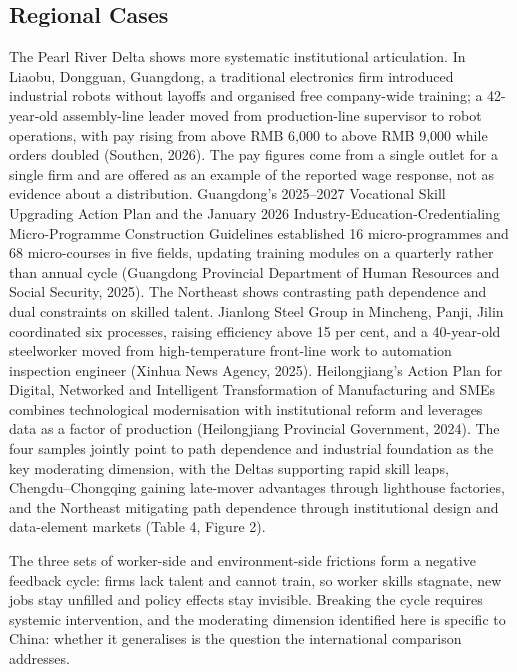 \documentclass[12pt]{article}
\begin{document}
\subsection{Regional Cases}

The Pearl River Delta shows more systematic institutional articulation. In Liaobu, Dongguan, Guangdong, a traditional electronics firm introduced industrial robots without layoffs and organised free company-wide training; a 42-year-old assembly-line leader moved from production-line supervisor to robot operations, with pay rising from above RMB 6,000 to above RMB 9,000 while orders doubled (Southcn, 2026). The pay figures come from a single outlet for a single firm and are offered as an example of the reported wage response, not as evidence about a distribution. Guangdong's 2025--2027 Vocational Skill Upgrading Action Plan and the January 2026 Industry-Education-Credentialing Micro-Programme Construction Guidelines established 16 micro-programmes and 68 micro-courses in five fields, updating training modules on a quarterly rather than annual cycle (Guangdong Provincial Department of Human Resources and Social Security, 2025). The Northeast shows contrasting path dependence and dual constraints on skilled talent. Jianlong Steel Group in Mincheng, Panji, Jilin coordinated six processes, raising efficiency above 15 per cent, and a 40-year-old steelworker moved from high-temperature front-line work to automation inspection engineer (Xinhua News Agency, 2025). Heilongjiang's Action Plan for Digital, Networked and Intelligent Transformation of Manufacturing and SMEs combines technological modernisation with institutional reform and leverages data as a factor of production (Heilongjiang Provincial Government, 2024). The four samples jointly point to path dependence and industrial foundation as the key moderating dimension, with the Deltas supporting rapid skill leaps, Chengdu--Chongqing gaining late-mover advantages through lighthouse factories, and the Northeast mitigating path dependence through institutional design and data-element markets (Table 4, Figure 2).





The three sets of worker-side and environment-side frictions form a negative feedback cycle: firms lack talent and cannot train, so worker skills stagnate, new jobs stay unfilled and policy effects stay invisible. Breaking the cycle requires systemic intervention, and the moderating dimension identified here is specific to China: whether it generalises is the question the international comparison addresses.
\end{document}
